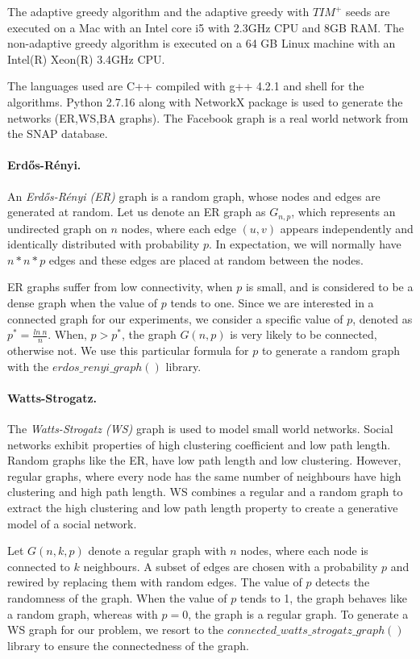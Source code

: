 The adaptive greedy algorithm and the adaptive greedy with $TIM^+$ seeds are executed on a Mac with an Intel core i5 with 2.3GHz CPU and 8GB RAM.
The non-adaptive greedy algorithm is executed on a 64 GB Linux machine with an Intel(R) Xeon(R) 3.4GHz CPU. 

The languages used are C++ compiled with g++ 4.2.1 and shell for the algorithms.
Python 2.7.16 along with NetworkX package is used to generate the networks (ER,WS,BA graphs). The Facebook graph is a real world network from the SNAP database.

\paragraph{Erdős-Rényi.} 

An \textit{Erdős-Rényi (ER)} graph \cite{erdos59a} is a random graph, whose nodes and edges are generated at random. Let us denote an ER graph as $G_{n,p}$, which represents an undirected graph on $n$ nodes, where each edge $(u,v)$ appears independently and identically distributed with probability $p$. In expectation, we will normally have $n*n*p$ edges and these edges are placed at random between the nodes. 

ER graphs suffer from low connectivity, when $p$ is small, and is considered to be a dense graph when the value of $p$ tends to one. Since we are interested in a connected graph for our experiments, we consider a specific value of $p$, denoted as $p^* = \frac{ln \ n}{n}$. When, $p>p^*$, the graph $G(n,p)$ is very likely to be connected, otherwise not. We use this particular formula for $p$ to generate a random graph with the $erdos\_renyi\_graph()$ library. 


\paragraph{Watts-Strogatz.}

The \textit{Watts-Strogatz (WS)} graph \cite{watts} is used to model small world networks. Social networks exhibit properties of high clustering coefficient and low path length. Random graphs like the ER, have low path length and low clustering. However, regular graphs, where every node has the same number of neighbours have high clustering and high path length. WS combines a regular and a random graph to extract the high clustering and low path length property to create a generative model of a social network. 

Let $G(n,k,p)$ denote a regular graph with $n$ nodes, where each node is connected to $k$ neighbours. A subset of edges are chosen with a probability $p$ and rewired by replacing them with random edges. The value of $p$ detects the randomness of the graph. When the value of $p$ tends to 1, the graph behaves like a random graph, whereas with $p=0$, the graph is a regular graph. To generate a WS graph for our problem, we resort to the $connected\_watts\_strogatz\_graph()$ library to ensure the connectedness of the graph. 


